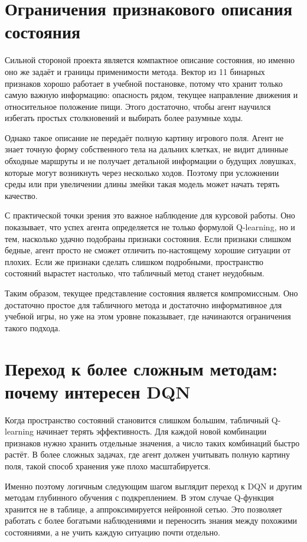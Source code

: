 \section{Ограничения признакового описания состояния}

Сильной стороной проекта является компактное описание состояния, но именно оно же задаёт и границы применимости метода. Вектор из 11 бинарных признаков хорошо работает в учебной постановке, потому что хранит только самую важную информацию: опасность рядом, текущее направление движения и относительное положение пищи. Этого достаточно, чтобы агент научился избегать простых столкновений и выбирать более разумные ходы.

Однако такое описание не передаёт полную картину игрового поля. Агент не знает точную форму собственного тела на дальних клетках, не видит длинные обходные маршруты и не получает детальной информации о будущих ловушках, которые могут возникнуть через несколько ходов. Поэтому при усложнении среды или при увеличении длины змейки такая модель может начать терять качество.

С практической точки зрения это важное наблюдение для курсовой работы. Оно показывает, что успех агента определяется не только формулой Q-learning, но и тем, насколько удачно подобраны признаки состояния. Если признаки слишком бедные, агент просто не сможет отличить по-настоящему хорошие ситуации от плохих. Если же признаки сделать слишком подробными, пространство состояний вырастет настолько, что табличный метод станет неудобным.

Таким образом, текущее представление состояния является компромиссным. Оно достаточно простое для табличного метода и достаточно информативное для учебной игры, но уже на этом уровне показывает, где начинаются ограничения такого подхода.

\section{Переход к более сложным методам: почему интересен DQN}

Когда пространство состояний становится слишком большим, табличный Q-learning начинает терять эффективность. Для каждой новой комбинации признаков нужно хранить отдельные значения, а число таких комбинаций быстро растёт. В более сложных задачах, где агент должен учитывать полную картину поля, такой способ хранения уже плохо масштабируется.

Именно поэтому логичным следующим шагом выглядит переход к DQN и другим методам глубинного обучения с подкреплением. В этом случае Q-функция хранится не в таблице, а аппроксимируется нейронной сетью. Это позволяет работать с более богатыми наблюдениями и переносить знания между похожими состояниями, а не учить каждую ситуацию почти отдельно.

